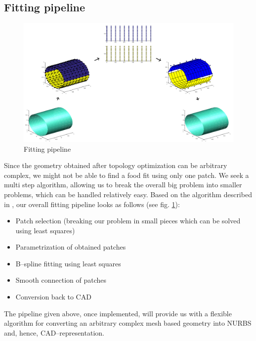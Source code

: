 \subsection{Fitting pipeline}
\begin{figure}
  \includegraphics[width=.85\linewidth]{Fitting_workflow.png}
  \caption{Fitting pipeline}
  \label{fig:fitting_pipeline}
\end{figure}
Since the geometry obtained after topology optimization can be arbitrary complex, we might not be able to find a food fit using only one patch. We seek a multi step algorithm, allowing us to break the overall big problem into smaller problems, which can be handled relatively easy.
Based on the algorithm described in \cite{eck1996automatic}, our overall fitting pipeline looks as follows (see fig. \ref{fig:fitting_pipeline}):
\begin{itemize}
	\item Patch selection (breaking our problem in small pieces which can be solved using least squares)
	\item Parametrization of obtained patches
	\item B--spline fitting using least squares
	\item Smooth connection of patches
	\item Conversion back to CAD
\end{itemize}

The pipeline given above, once implemented, will provide us with a flexible algorithm for converting an arbitrary complex mesh based geometry into NURBS and, hence, CAD--representation.
